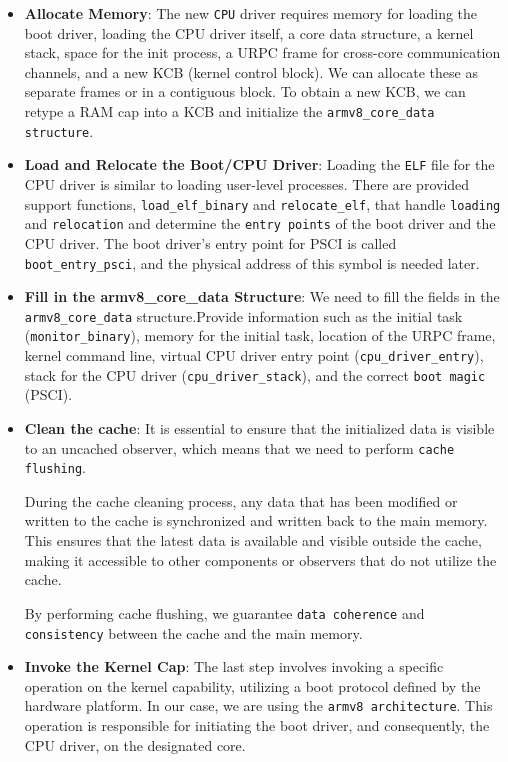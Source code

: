 \begin{itemize}
\item \textbf{Allocate Memory}: The new \texttt{CPU} driver requires memory for loading the boot driver, loading the CPU driver itself, a core data structure, a kernel stack, space for the init process, a URPC frame for cross-core communication channels, and a new KCB (kernel control block). We can allocate these as separate frames or in a contiguous block. To obtain a new KCB, we can retype a RAM cap into a KCB and initialize the \texttt{armv8\_core\_data structure}.

\item \textbf{Load and Relocate the Boot/CPU Driver}: Loading the \texttt{ELF} file for the CPU driver is similar to loading user-level processes. There are provided support functions, \texttt{load\_elf\_binary} and \texttt{relocate\_elf}, that handle \texttt{loading} and \texttt{relocation} and determine the \texttt{entry points} of the boot driver and the CPU driver. The boot driver's entry point for PSCI is called \texttt{boot\_entry\_psci}, and the physical address of this symbol is needed later. 

\item \textbf{Fill in the armv8\_core\_data Structure}: We need to fill the fields in the \texttt{armv8\_core\_data} structure.Provide information such as the initial task (\texttt{monitor\_binary}), memory for the initial task, location of the URPC frame, kernel command line, virtual CPU driver entry point (\texttt{cpu\_driver\_entry}), stack for the CPU driver (\texttt{cpu\_driver\_stack}), and the correct \texttt{boot magic} (PSCI).

\item \textbf{Clean the cache}: It is essential to ensure that the initialized data is visible to an uncached observer, which means that we need to perform \texttt{cache flushing}.

During the cache cleaning process, any data that has been modified or written to the cache is synchronized and written back to the main memory. This ensures that the latest data is available and visible outside the cache, making it accessible to other components or observers that do not utilize the cache.

By performing cache flushing, we guarantee \texttt{data coherence} and \texttt{consistency} between the cache and the main memory.

\item \textbf{Invoke the Kernel Cap}: The last step involves invoking a specific operation on the kernel capability, utilizing a boot protocol defined by the hardware platform. In our case, we are using the \texttt{armv8 architecture}. This operation is responsible for initiating the boot driver, and consequently, the CPU driver, on the designated core.
\end{itemize}

